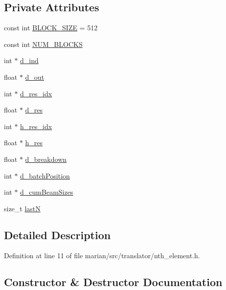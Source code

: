 \subsection*{Private Attributes}
\begin{DoxyCompactItemize}
\item 
const int \hyperlink{classmarian_1_1NthElement_a5ec55b57889be6ddb715b94eb4c59dae}{B\+L\+O\+C\+K\+\_\+\+S\+I\+ZE} = 512
\item 
const int \hyperlink{classmarian_1_1NthElement_a813081a72cbe6e9d25e2cf8a964d23be}{N\+U\+M\+\_\+\+B\+L\+O\+C\+KS}
\item 
int $\ast$ \hyperlink{classmarian_1_1NthElement_a2b139afaa92c3639701ff110b6a826c5}{d\+\_\+ind}
\item 
float $\ast$ \hyperlink{classmarian_1_1NthElement_af19e2b5ded5b809af4cd3d7ae5fabd76}{d\+\_\+out}
\item 
int $\ast$ \hyperlink{classmarian_1_1NthElement_a902de96295f9d6d6af55b4a3a30fe713}{d\+\_\+res\+\_\+idx}
\item 
float $\ast$ \hyperlink{classmarian_1_1NthElement_abac41ccdf9479bde12bf6d801e89e704}{d\+\_\+res}
\item 
int $\ast$ \hyperlink{classmarian_1_1NthElement_acb9fa9a306f3e380e7832f8e8206fa31}{h\+\_\+res\+\_\+idx}
\item 
float $\ast$ \hyperlink{classmarian_1_1NthElement_ae1dbf516946343df761ebabd1185bf60}{h\+\_\+res}
\item 
float $\ast$ \hyperlink{classmarian_1_1NthElement_aa92fceb2668bbd60cd7a913c1df6a3ae}{d\+\_\+breakdown}
\item 
int $\ast$ \hyperlink{classmarian_1_1NthElement_a54af0de1bc7a4d62c0a5ce7fb7523a64}{d\+\_\+batch\+Position}
\item 
int $\ast$ \hyperlink{classmarian_1_1NthElement_ad8715fa3b2b2b3de6a9949ac84de52df}{d\+\_\+cum\+Beam\+Sizes}
\item 
size\+\_\+t \hyperlink{classmarian_1_1NthElement_a6a57bd79e06383c8e1a078d4acf76b8f}{lastN}
\end{DoxyCompactItemize}


\subsection{Detailed Description}


Definition at line 11 of file marian/src/translator/nth\+\_\+element.\+h.



\subsection{Constructor \& Destructor Documentation}

